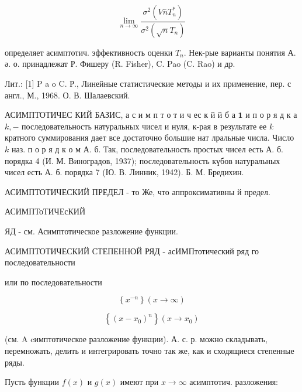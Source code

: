 \documentclass[10pt]{article}
\begin{document}
\[

\lim _{n \rightarrow \infty} \frac{\sigma^{2}\left(V \bar{n} T_{n}^{*}\right)}{\sigma^{2}\left(\sqrt{n} T_{n}\right)}

\]



определяет асимптотич. эффективность оценки $T_{n}$. Нек-рые варианты понятия А. ә. о. принадлежат Р. Фишеру (R. Fisher), C. Pao (C. Rao) и др.



Лит.: [1] P a o C. Р., Линейные статистические методы и их применение, пер. с англ., М., 1968. О. В. Шалаевский.



АСИМПТОТИЧЕС КИЙ БАЗИС, а с и м п т о т и ч ес к й й б а $\mathbf{1}$ и п о р я д к а $k,-$ последовательность натуральных чисел и нуля, к-рая в результате ее $k$ кратного суммирования дает все достаточно большие нат лральные числа. Число $k$ наз. п о р я д к о м А. б. Так, последовательность простых чисел есть А. б. порядка 4 (И. М. Виноградов, 1937); последовательность күбов натуральных чисел есть А. б. порядка 7 (Ю. В. Линник, 1942). Б. М. Бредихин.



АСИМПТОТИЧЕСКИЙ ПРЕДЕЛ - то Же, что аппроксимативны й предел.

АСИМПТоТИЧЕсКИЙ

ЯД - см. Асимптотическое разложение функции.



АСИМПТОТИЧЕСКИЙ СТЕПЕННОЙ РЯД - асИМПтотический ряд го последовательности



или по последовательности



\[

\left\{x^{-n}\right\}(x \rightarrow \infty)

\]



\[

\left\{\left(x-x_{0}\right)^{n}\right\}\left(x \rightarrow x_{0}\right)

\]



(см. A cимптотическое разложение функции). А. с. р. можно складывать, перемножать, делить и интегрировать точно так же, как и сходящиеся степенные ряды.



Пусть функции $f(x)$ и $g(x)$ имеют при $x \rightarrow \infty$ асимптотич. разложения:
\end{document}
